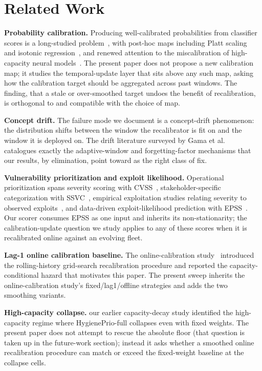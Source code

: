 \section{Related Work}

\textbf{Probability calibration.} Producing well-calibrated
probabilities from classifier scores is a long-studied
problem~\cite{niculescu2005predicting}, with post-hoc maps including
Platt scaling~\cite{platt1999probabilistic} and isotonic
regression~\cite{zadrozny2002transforming}, and renewed attention to
the miscalibration of high-capacity neural
models~\cite{guo2017calibration}. The present paper does not propose a
new calibration map; it studies the temporal-update layer that sits
above any such map, asking how the calibration target should be
aggregated across past windows. The finding, that a stale or
over-smoothed target undoes the benefit of recalibration, is
orthogonal to and compatible with the choice of map.

\textbf{Concept drift.} The failure mode we document is a concept-drift
phenomenon: the distribution shifts between the window the
recalibrator is fit on and the window it is deployed on. The drift
literature surveyed by Gama et al.~\cite{gama2014survey} catalogues
exactly the adaptive-window and forgetting-factor mechanisms that our
results, by elimination, point toward as the right class of fix.

\textbf{Vulnerability prioritization and exploit likelihood.}
Operational prioritization spans severity scoring with
CVSS~\cite{mell2007cvss}, stakeholder-specific categorization with
SSVC~\cite{spring2021ssvc}, empirical exploitation studies relating
severity to observed exploits~\cite{allodi2014comparing}, and
data-driven exploit-likelihood prediction with
EPSS~\cite{jacobs2021epss}. Our scorer consumes EPSS as one input and
inherits its non-stationarity; the calibration-update question we
study applies to any of these scores when it is recalibrated online
against an evolving fleet.

\textbf{Lag-1 online calibration baseline.}
The online-calibration study~\cite{paper7online} introduced the rolling-history grid-search
recalibration procedure and reported the capacity-conditional hazard
that motivates this paper. The present sweep inherits the online-calibration study's
\textsf{fixed}/\textsf{lag1}/\textsf{offline} strategies and adds the
two smoothing variants.

\textbf{High-capacity collapse.} our earlier capacity-decay study
identified the high-capacity regime where HygienePrio-full collapses
even with fixed weights. The present paper does not attempt to rescue
the absolute floor (that question is taken up in the future-work
section); instead it asks whether a smoothed online recalibration
procedure can match or exceed the fixed-weight baseline at the
collapse cells.

